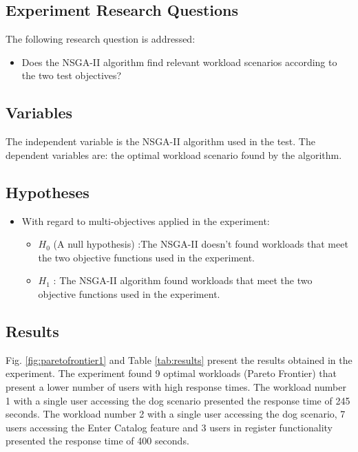 \subsection{Experiment Research Questions}

The following research question is addressed:
\begin{itemize}
\item Does the NSGA-II algorithm find relevant workload scenarios according to the two test objectives?
\end{itemize}

\subsection{Variables}

The independent variable is the NSGA-II algorithm used in the test. The dependent variables are: the optimal workload scenario found by the algorithm.

\subsection{Hypotheses}

\begin{itemize}
\item With regard to multi-objectives applied in the experiment:
\begin{itemize}
\item $H_{0}$ (A null hypothesis) :The NSGA-II doesn't found workloads that meet the two objective functions used in the experiment.
\item $H_{1}$  : The NSGA-II  algorithm found workloads that meet the two objective functions used in the experiment.
\end{itemize}
\end{itemize}

\subsection{Results}

Fig. \ref{fig:paretofrontier1} and Table \ref{tab:results} present the results obtained in the experiment. The experiment found 9 optimal workloads (Pareto Frontier) that present a lower number of users with high response times. The workload number 1 with a single user accessing the dog scenario presented the response time of 245 seconds.  The workload number 2 with a single user accessing the dog scenario, 7 users accessing the Enter Catalog feature and 3 users in register functionality presented the response time of 400 seconds.



